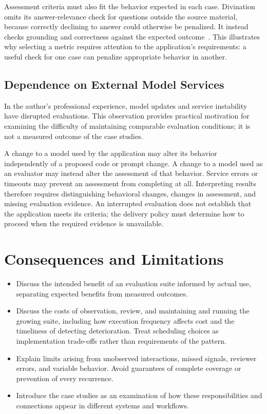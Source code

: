 Assessment criteria must also fit the behavior expected in each case. Divination
omits its answer-relevance check for questions outside the source material,
because correctly declining to answer could otherwise be penalized. It instead
checks grounding and correctness against the expected
outcome~\parencite{Divination:Evaluations}. This illustrates why selecting a
metric requires attention to the application's requirements: a useful check
for one case can penalize appropriate behavior in another.

\subsection{Dependence on External Model Services}

In the author's professional experience, model updates and service instability
have disrupted evaluations. This observation provides practical motivation
for examining the difficulty of maintaining comparable evaluation conditions;
it is not a measured outcome of the case studies.

A change to a model used by the application may alter its behavior independently
of a proposed code or prompt change. A change to a model used as an evaluator
may instead alter the assessment of that behavior. Service errors or timeouts
may prevent an assessment from completing at all. Interpreting results therefore
requires distinguishing behavioral changes, changes in assessment, and missing
evaluation evidence. An interrupted evaluation does not establish that the
application meets its criteria; the delivery policy must determine how to
proceed when the required evidence is unavailable.


\section{Consequences and Limitations}
\label{sec:cd4ai-consequences}

\begin{itemize}
  \item Discuss the intended benefit of an evaluation suite informed by actual
    use, separating expected benefits from measured outcomes.
  \item Discuss the costs of observation, review, and maintaining and running
    the growing suite, including how execution frequency affects cost and the
    timeliness of detecting deterioration. Treat scheduling choices as
    implementation trade-offs rather than requirements of the pattern.
  \item Explain limits arising from unobserved interactions, missed signals,
    reviewer errors, and variable behavior. Avoid guarantees of complete
    coverage or prevention of every recurrence.
  \item Introduce the case studies as an examination of how these responsibilities
    and connections appear in different systems and workflows.
\end{itemize}

